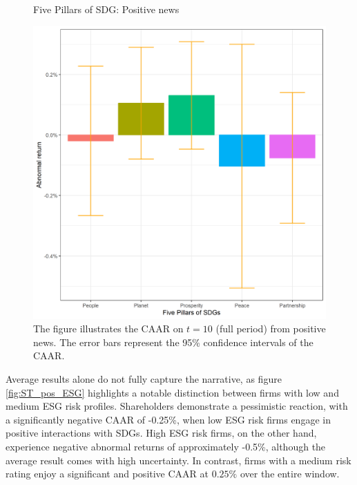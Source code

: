 \begin{figure} [H]
    \centering
    \caption{Five Pillars of SDG: Positive news}
    \includegraphics[scale=0.6]{Projekt/1.Figures analysis/ST_positive_sdg_bar_groups_0.png}
    \caption*{\footnotesize The figure illustrates the CAAR on $t = 10$ (full period) from positive news. The error bars represent the 95\% confidence intervals of the CAAR.}
    \label{fig:ST_pos_bar}
\end{figure}

Average results alone do not fully capture the narrative, as figure \ref{fig:ST_pos_ESG} highlights a notable distinction between firms with low and medium ESG risk profiles. Shareholders demonstrate a pessimistic reaction, with a significantly negative CAAR of -0.25\%, when low ESG risk firms engage in positive interactions with SDGs. 
High ESG risk firms, on the other hand, experience negative abnormal returns of approximately -0.5\%, although the average result comes with high uncertainty. In contrast, firms with a medium risk rating enjoy a significant and positive CAAR at $0.25\%$ over the entire  window. 

